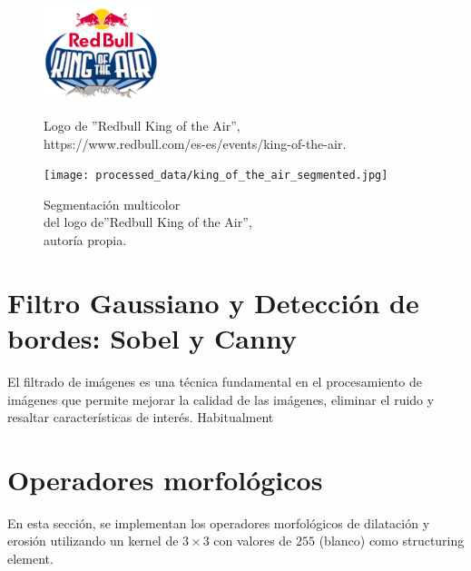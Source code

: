 \documentclass[a4paper,12pt]{article}
\begin{document}
{\begin{figure}[H]
\end{figure}

\begin{figure}[H]
  
  \begin{minipage}[t]{0.6\textwidth}
    \includegraphics[width=0.3\textwidth]{data/king_of_the_air.png}
    \caption{Logo de ''Redbull King of the Air'',\\https://www.redbull.com/es-es/events/king-of-the-air.}
    \label{fig:redbull_original}
  \end{minipage}
  \hfill
  \hspace{1.5cm}
  \begin{minipage}[t]{0.6\textwidth}
    \texttt{[image: processed\_data/king\_of\_the\_air\_segmented.jpg]}
    \caption{Segmentación multicolor\\del logo de''Redbull King of the Air'',\\ autoría propia.}
    \label{fig:redbull_segmentation}
  \end{minipage}

\end{figure}


\section{Filtro Gaussiano y Detección de bordes: Sobel y Canny}


\vspace{1cm}

El filtrado de imágenes es una técnica fundamental en el procesamiento de imágenes que permite mejorar la calidad de las imágenes, eliminar el ruido y resaltar 
características de interés. Habitualment

\section{Operadores morfológicos}

En esta sección, se implementan los operadores morfológicos de dilatación y erosión
utilizando un kernel de \(3 \times 3\) con valores de \(255\) (blanco) como structuring element. 

}
\end{document}
